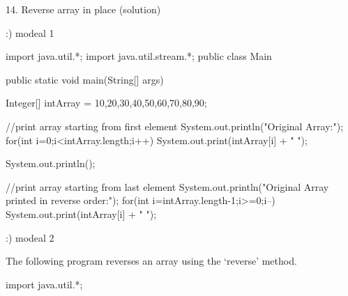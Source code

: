 14. Reverse array in place (solution)

:) modeal 1


	import java.util.*;
import java.util.stream.*;
public class Main
{
    public static void main(String[] args) {
    Integer[] intArray = {10,20,30,40,50,60,70,80,90};
     
  //print array starting from first element
    System.out.println("Original Array:");
    for(int i=0;i<intArray.length;i++)
         System.out.print(intArray[i] + "  ");
     
    System.out.println();
     
    //print array starting from last element
    System.out.println("Original Array printed in reverse order:");
         for(int i=intArray.length-1;i>=0;i--)
         System.out.print(intArray[i] + "  ");
    }
}

:) modeal 2
		
		The following program reverses an array using the ‘reverse’ method.

   import java.util.*; 
 
